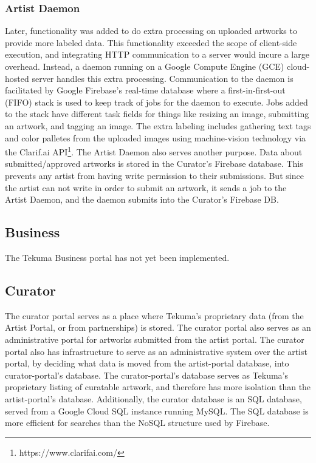 \documentclass[fontsize=12pt]{scrartcl} %
\numberwithin{equation}{section} %
\numberwithin{figure}{section} %
\numberwithin{table}{section} %
\begin{document}
\subsubsection{Artist Daemon}
Later, functionality was added to do extra processing on uploaded artworks to provide more labeled data. This functionality exceeded the scope of client-side execution, and integrating HTTP communication to a server would incure a large overhead. Instead, a daemon running on a Google Compute Engine (GCE) cloud-hosted server handles this extra processing. Communication to the daemon is facilitated by Google Firebase’s real-time database where a first-in-first-out (FIFO) stack is used to keep track of jobs for the daemon to execute. Jobs added to the stack have different task fields for things like resizing an image, submitting an artwork, and tagging an image. The extra labeling includes gathering text tags and color palletes from the uploaded images using machine-vision technology via the Clarif.ai API\footnote{https://www.clarifai.com/}. The Artist Daemon also serves another purpose. Data about submitted/approved artworks is stored in the Curator's Firebase database. This prevents any artist from having write permission to their submissions. But since the artist can not write in order to submit an artwork, it sends a job to the Artist Daemon, and the daemon submits into the Curator's Firebase DB.

\subsection{Business}
The Tekuma Business portal has not yet been implemented.\\

\subsection{Curator}

The curator portal serves as a place where Tekuma’s proprietary data (from the Artist Portal, or from partnerships) is stored. The curator portal also serves as an administrative portal for artworks submitted from the artist portal. The curator portal also has infrastructure to serve as an administrative system over the artist portal, by deciding what data is moved from the artist-portal database, into curator-portal’s database.
The curator-portal’s database serves as Tekuma’s proprietary listing of curatable artwork, and therefore has more isolation than the artist-portal’s database. Additionally, the curator database is an SQL database, served from a Google Cloud SQL instance running MySQL. The SQL database is more efficient for searches than the NoSQL structure used by Firebase.
\end{document}
